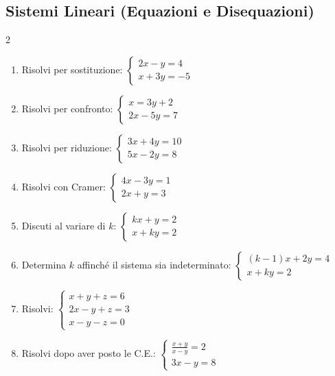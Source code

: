 \subsection{Sistemi Lineari (Equazioni e Disequazioni)}
\begin{multicols}{2}
\begin{enumerate}
    \item {} Risolvi per sostituzione: $\begin{cases} 2x - y = 4 \\ x + 3y = -5 \end{cases}$
    \item {} Risolvi per confronto: $\begin{cases} x = 3y + 2 \\ 2x - 5y = 7 \end{cases}$
    \item {} Risolvi per riduzione: $\begin{cases} 3x + 4y = 10 \\ 5x - 2y = 8 \end{cases}$
    \item {} Risolvi con Cramer: $\begin{cases} 4x - 3y = 1 \\ 2x + y = 3 \end{cases}$
    \item {} Discuti al variare di $k$: $\begin{cases} kx + y = 2 \\ x + ky = 2 \end{cases}$
    \item {} Determina $k$ affinché il sistema sia indeterminato: $\begin{cases} (k-1)x + 2y = 4 \\ x + ky = 2 \end{cases}$
    \item {} Risolvi: $\begin{cases} x+y+z=6 \\ 2x-y+z=3 \\ x-y-z=0 \end{cases}$
    \item {} Risolvi dopo aver posto le C.E.: $\begin{cases} \frac{x+y}{x-y}=2 \\ 3x-y=8 \end{cases}$

\end{enumerate}
\end{multicols}
